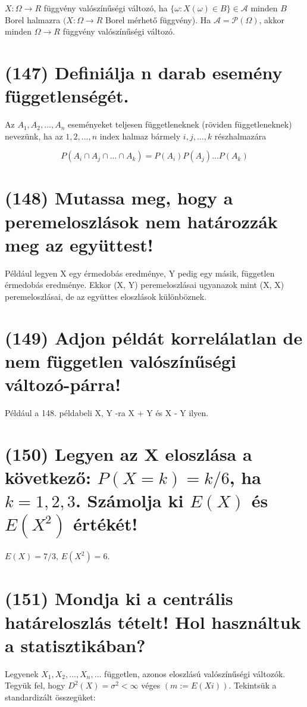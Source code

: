 \documentclass[12p]{article}
\begin{document}
$X : \Omega \rightarrow R$ függvény valószínűségi változó, ha $\{\omega: X(\omega) \in B\} \in \mathscr{A}$ minden $B$ Borel halmazra $(X: \Omega \rightarrow R$ Borel mérhető függvény).
Ha $\mathscr{A} = \mathscr{P}(\Omega)$, akkor minden $\Omega \rightarrow R$ függvény valószínűségi változó.


\section{(147) Definiálja n darab esemény függetlenségét.}

Az $A_1,A_2, ..., A_n$ eseményeket teljesen függetleneknek (röviden függetleneknek) nevezünk, ha az ${1, 2, ..., n}$ index halmaz bármely ${i, j, ..., k}$ részhalmazára

$$P(A_i \cap A_j \cap ... \cap A_k) = P(A_i)P(A_j)...P(A_k)$$

\section{(148) Mutassa meg, hogy a peremeloszlások nem határozzák meg az együttest!}

Például legyen X egy érmedobás eredménye, Y pedig egy másik, független érmedobás eredménye. Ekkor (X, Y) peremeloszlásai ugyanazok mint (X, X) peremeloszlásai, de az együttes eloszlások különböznek.

\section{(149) Adjon példát korrelálatlan de nem független valószínűségi változó-párra!}

Például a 148. példabeli X, Y -ra X + Y és X - Y ilyen.

\section{(150) Legyen az X eloszlása a következő: $P(X = k) = k/6$, ha $k = 1, 2, 3$. Számolja ki $E(X)$ és $E(X^2)$ értékét!}

$E(X) = 7/3$, $E(X^2) = 6$.

\section{(151) Mondja ki a centrális határeloszlás tételt! Hol használtuk a statisztikában?}

Legyenek $X_1 , X_2 ,..., X_n ,...$ független, azonos eloszlású valószínűségi változók. Tegyük fel, hogy $D^2(X) = \sigma^2 < \infty$ véges $(m:=E(Xi))$. Tekintsük a standardizált összegüket:
\end{document}
